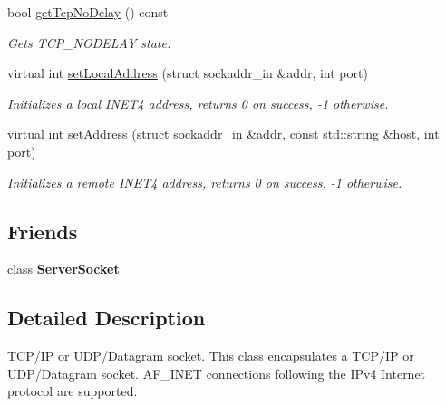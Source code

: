 \begin{DoxyCompactItemize}
\mbox{\label{classcppu_1_1_socket_ae92a92e5ea17b4f1ccc17e614548053c}} 
bool \mbox{\hyperlink{classcppu_1_1_socket_ae92a92e5ea17b4f1ccc17e614548053c}{get\+Tcp\+No\+Delay}} () const
\begin{DoxyCompactList}\small\item\em Gets T\+C\+P\+\_\+\+N\+O\+D\+E\+L\+AY state. \end{DoxyCompactList}\item 
\mbox{\label{classcppu_1_1_socket_a73d529332eae6048b321b381354e6bea}} 
virtual int \mbox{\hyperlink{classcppu_1_1_socket_a73d529332eae6048b321b381354e6bea}{set\+Local\+Address}} (struct sockaddr\+\_\+in \&addr, int port)
\begin{DoxyCompactList}\small\item\em Initializes a local I\+N\+E\+T4 address, returns 0 on success, -\/1 otherwise. \end{DoxyCompactList}\item 
\mbox{\label{classcppu_1_1_socket_aec26c9f6372f7ed2ec383fc98cbb6458}} 
virtual int \mbox{\hyperlink{classcppu_1_1_socket_aec26c9f6372f7ed2ec383fc98cbb6458}{set\+Address}} (struct sockaddr\+\_\+in \&addr, const std\+::string \&host, int port)
\begin{DoxyCompactList}\small\item\em Initializes a remote I\+N\+E\+T4 address, returns 0 on success, -\/1 otherwise. \end{DoxyCompactList}\end{DoxyCompactItemize}
\subsection*{Friends}
\begin{DoxyCompactItemize}
\item 
\mbox{\label{classcppu_1_1_socket_a11a8bb11feaafab939278a8285afa567}} 
class {\bfseries Server\+Socket}
\end{DoxyCompactItemize}


\subsection{Detailed Description}
T\+C\+P/\+IP or U\+D\+P/\+Datagram socket. This class encapsulates a T\+C\+P/\+IP or U\+D\+P/\+Datagram socket. A\+F\+\_\+\+I\+N\+ET connections following the I\+Pv4 Internet protocol are supported. 

